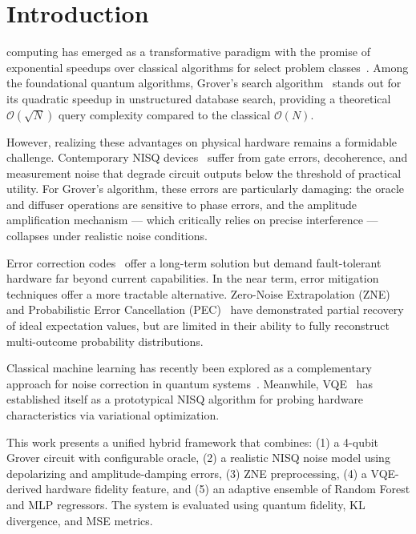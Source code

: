 \documentclass[journal]{IEEEtran}
\begin{document}
\section{Introduction}

 computing has emerged as a transformative paradigm with the promise of exponential speedups over classical algorithms for select problem classes~\cite{nielsen2010}. Among the foundational quantum algorithms, Grover's search algorithm~\cite{grover1996} stands out for its quadratic speedup in unstructured database search, providing a theoretical $\mathcal{O}(\sqrt{N})$ query complexity compared to the classical $\mathcal{O}(N)$.

However, realizing these advantages on physical hardware remains a formidable challenge. Contemporary NISQ devices~\cite{preskill2018} suffer from gate errors, decoherence, and measurement noise that degrade circuit outputs below the threshold of practical utility. For Grover's algorithm, these errors are particularly damaging: the oracle and diffuser operations are sensitive to phase errors, and the amplitude amplification mechanism --- which critically relies on precise interference --- collapses under realistic noise conditions.

Error correction codes~\cite{gottesman1997} offer a long-term solution but demand fault-tolerant hardware far beyond current capabilities. In the near term, error mitigation techniques offer a more tractable alternative. Zero-Noise Extrapolation (ZNE)~\cite{temme2017} and Probabilistic Error Cancellation (PEC)~\cite{endo2018} have demonstrated partial recovery of ideal expectation values, but are limited in their ability to fully reconstruct multi-outcome probability distributions.

Classical machine learning has recently been explored as a complementary approach for noise correction in quantum systems~\cite{zlokapa2020,bennewitz2022}. Meanwhile, VQE~\cite{peruzzo2014} has established itself as a prototypical NISQ algorithm for probing hardware characteristics via variational optimization.

This work presents a unified hybrid framework that combines: (1) a 4-qubit Grover circuit with configurable oracle, (2) a realistic NISQ noise model using depolarizing and amplitude-damping errors, (3) ZNE preprocessing, (4) a VQE-derived hardware fidelity feature, and (5) an adaptive ensemble of Random Forest and MLP regressors. The system is evaluated using quantum fidelity, KL divergence, and MSE metrics.
\end{document}
